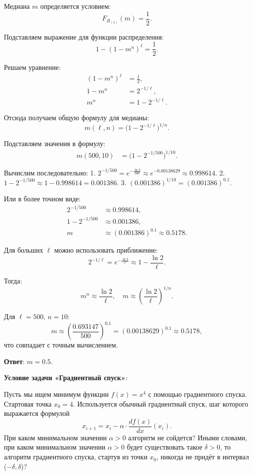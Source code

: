 \documentclass[pract]{SCWorks}
\begin{document}
    Медиана $m$ определяется условием:
    \[
    F_{R_{(1)}}(m) = \frac{1}{2}.
    \]

    Подставляем выражение для функции распределения:
    \[
    1 - (1 - m^n)^{\ell} = \frac{1}{2}.
    \]

    Решаем уравнение:
    \[
    \begin{aligned}
    (1 - m^n)^{\ell} &= \frac{1}{2}, \\
    1 - m^n &= 2^{-1/\ell}, \\
    m^n &= 1 - 2^{-1/\ell}.
    \end{aligned}
    \]

    Отсюда получаем общую формулу для медианы:
    \[
    \boxed{m(\ell, n) = \bigl(1 - 2^{-1/\ell}\bigr)^{1/n}}.
    \]

    Подставляем значения в формулу:
    \[
    \begin{aligned}
    m(500, 10) &= \bigl(1 - 2^{-1/500}\bigr)^{1/10}.
    \end{aligned}
    \]

    Вычислим последовательно:
    1. $2^{-1/500} = e^{-\frac{\ln 2}{500}} \approx e^{-0.00138629} \approx 0.998614$.
    2. $1 - 2^{-1/500} \approx 1 - 0.998614 = 0.001386$.
    3. $(0.001386)^{1/10} = (0.001386)^{0.1}$.

    Или в более точном виде:
    \[
    \begin{aligned}
    2^{-1/500} &\approx 0.998614, \\
    1 - 2^{-1/500} &\approx 0.001386, \\
    m &\approx (0.001386)^{0.1} \approx 0.5178.
    \end{aligned}
    \]

    Для больших $\ell$ можно использовать приближение:
    \[
    2^{-1/\ell} = e^{-\frac{\ln 2}{\ell}} \approx 1 - \frac{\ln 2}{\ell}.
    \]

    Тогда:
    \[
    m^n \approx \frac{\ln 2}{\ell}, \quad m \approx \left(\frac{\ln 2}{\ell}\right)^{1/n}.
    \]

    Для $\ell=500$, $n=10$:
    \[
    m \approx \left(\frac{0.693147}{500}\right)^{0.1} = (0.00138629)^{0.1} \approx 0.5178,
    \]
    что совпадает с точным вычислением.

    \textbf{Ответ}: $m = 0.5$.

    \textbf{Условие задачи «Градиентный спуск»}:

    Пусть мы ищем минимум функции $f(x) = x^4$ с помощью градиентного спуска.
    Стартовая точка $x_0 = 4$. Используется обычный градиентный спуск, шаг которого выражается формулой
    \[
        x_{i+1} = x_i - \alpha \cdot \frac{df(x)}{dx}(x_i).
    \]
    При каком минимальном значении $\alpha > 0$ алгоритм не сойдется?
    Иными словами, при каком минимальном значении $\alpha > 0$ будет существовать такое $\delta > 0$, то алгоритм градиентного спуска, стартуя из точки $x_0$, никогда не придёт в интервал ($-\delta, \delta$)?
\end{document}
